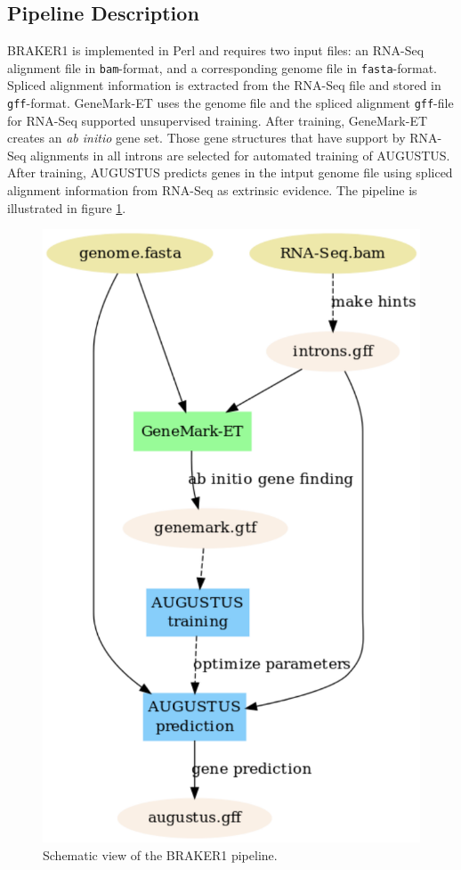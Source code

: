 \documentclass{bioinfo}
\begin{document}
\begin{methods}
\section{Pipeline Description}

BRAKER1 is implemented in Perl and requires two input files: an RNA-Seq alignment file in \texttt{bam}-format, and a corresponding genome file in \texttt{fasta}-format. Spliced alignment information is extracted from the RNA-Seq file and stored in \texttt{gff}-format. GeneMark-ET uses the genome file and  the spliced alignment \texttt{gff}-file for RNA-Seq supported unsupervised training. After training, GeneMark-ET creates an \textit{ab initio} gene set. Those gene structures that have support by RNA-Seq alignments in all introns are selected for automated training of AUGUSTUS. After training, AUGUSTUS predicts genes in the intput genome file using spliced alignment information from RNA-Seq as extrinsic evidence. The pipeline is illustrated in figure \ref{pipeline}.

\begin{figure}[!tpb]%
\centerline{\includegraphics[width=0.6\linewidth]{figs/simple_braker.pdf}}
\caption{Schematic view of the BRAKER1 pipeline.}\label{pipeline}
\end{figure}


\end{methods}
\end{document}
